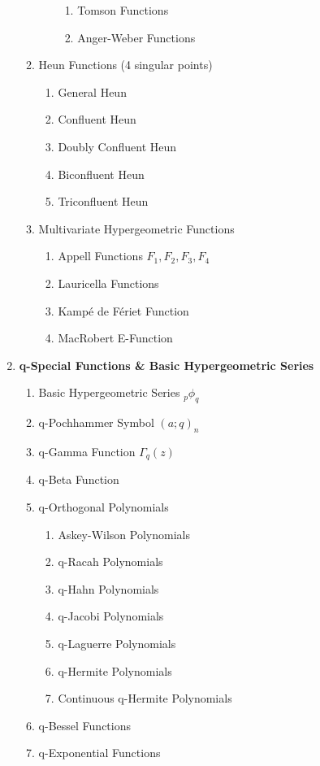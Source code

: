 \begin{enumerate}[label=\textbf{\arabic*.}]
\begin{enumerate}[label=\textbf{\alph*)}]
\begin{enumerate}[label=\textbf{\roman*)}]
\begin{enumerate}[label=\textbf{\arabic*)}]
				\item Tomson Functions
				\item Anger-Weber Functions
			\end{enumerate}
		\end{enumerate}
		\item Heun Functions (4 singular points)
		\begin{enumerate}[label=\textbf{\roman*)}]
			\item General Heun
			\item Confluent Heun
			\item Doubly Confluent Heun
			\item Biconfluent Heun
			\item Triconfluent Heun
		\end{enumerate}
		\item Multivariate Hypergeometric Functions
		\begin{enumerate}[label=\textbf{\roman*)}]
			\item Appell Functions $F_1, F_2, F_3, F_4$
			\item Lauricella Functions
			\item Kampé de Fériet Function
			\item MacRobert E-Function
		\end{enumerate}
	\end{enumerate}
	
	\item \textbf{q-Special Functions \& Basic Hypergeometric Series}
	\begin{enumerate}[label=\textbf{\alph*)}]
		\item Basic Hypergeometric Series ${}_p\phi_q$
		\item q-Pochhammer Symbol $(a;q)_n$
		\item q-Gamma Function $\Gamma_q(z)$
		\item q-Beta Function
		\item q-Orthogonal Polynomials
		\begin{enumerate}[label=\textbf{\roman*)}]
			\item Askey-Wilson Polynomials
			\item q-Racah Polynomials
			\item q-Hahn Polynomials
			\item q-Jacobi Polynomials
			\item q-Laguerre Polynomials
			\item q-Hermite Polynomials
			\item Continuous q-Hermite Polynomials
		\end{enumerate}
		\item q-Bessel Functions
		\item q-Exponential Functions
	\end{enumerate}
	

\end{enumerate}
